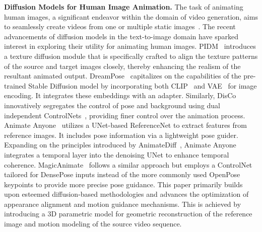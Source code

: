 \textbf{Diffusion Models for Human Image Animation.}
The task of animating human images, a significant endeavor within the domain of video generation, aims to seamlessly create videos from one or multiple static images~\cite{chan2019everybody,ren2020deep,siarohin2019first,siarohin2021motion,yu2023bidirectionally,zhang2022exploring,zhao2022thin,yoon2021pose, sarkar2021neural, hu2023sherf, albahar2023humansgd, cao2023dreamavatar, prokudin2021smplpix, fu2022styleganhuman, jiang2023humangen}.
The recent advancements of diffusion models in the text-to-image domain have sparked interest in exploring their utility for animating human images.
PIDM~\cite{bhunia2023person} introduces a texture diffusion module that is specifically crafted to align the texture patterns of the source and target images closely, thereby enhancing the realism of the resultant animated output.
DreamPose~\cite{karras2023dreampose} capitalizes on the capabilities of the pre-trained Stable Diffusion model by incorporating both CLIP~\cite{radford2021learning} and VAE~\cite{kingma2013auto} for image encoding. 
It integrates these embeddings with an adapter. 
Similarly, DisCo~\cite{wang2023disco} innovatively segregates the control of pose and background using dual independent ControlNets~\cite{zhang2023adding}, providing finer control over the animation process. 
Animate Anyone~\cite{hu2023animate} utilizes a UNet-based ReferenceNet to extract features from reference images.
It includes pose information via a lightweight pose guider. Expanding on the principles introduced by AnimateDiff~\cite{guo2023animatediff}, Animate Anyone integrates a temporal layer into the denoising UNet to enhance temporal coherence.
MagicAnimate~\cite{xu2023magicanimate} follows a similar approach but employs a ControlNet tailored for DensePose \cite{guler2018dense} inputs instead of the more commonly used OpenPose~\cite{cao2017realtime} keypoints to provide more precise pose guidance.
This paper primarily builds upon esteemed diffusion-based methodologies and advances the optimization of appearance alignment and motion guidance mechanisms. 
This is achieved by introducing a 3D parametric model for geometric reconstruction of the reference image and motion modeling of the source video sequence.



